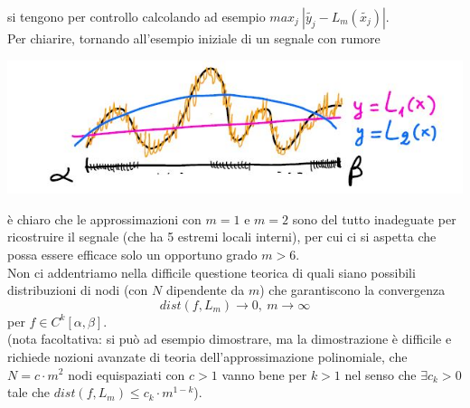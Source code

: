 \documentclass[12pt,a4paper]{article}
\begin{document}
si tengono per controllo calcolando ad esempio $max_j\  |\tilde{y_j}-L_m(\tilde{x_j})|$.\\Per chiarire, tornando all'esempio iniziale di un segnale con rumore
\begin{center}
    \includegraphics[scale=0.7]{calcolo32.JPG}
\end{center}
è chiaro che le approssimazioni con $m=1$ e $m=2$ sono del tutto inadeguate per ricostruire il segnale (che ha 5 estremi locali interni), per cui ci si aspetta che possa essere efficace solo un opportuno grado $m>6$.\\
Non ci addentriamo nella difficile questione teorica di quali siano possibili distribuzioni di nodi (con $N$ dipendente da $m$) che garantiscono la convergenza 
\[
dist(f, L_m) \to 0, \ m \to \infty
\]
per $f \in C^k[\alpha, \beta]$.\\
(nota facoltativa: si può ad esempio dimostrare, ma la dimostrazione è difficile e richiede nozioni avanzate di teoria dell'approssimazione polinomiale, che $N = c \cdot m^2$ nodi equispaziati con $c>1$ vanno bene per $k>1$ nel senso che $\exists c_k > 0$ tale che $dist(f,L_m) \leq c_k \cdot m^{1-k}$).
\end{document}
